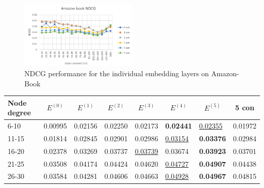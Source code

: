 \begin{figure}[]
    \includegraphics[width=0.5\textwidth]{figures/evaluation/amazon-book-ndcg.png}
    \centering
    \caption{NDCG performance for the individual embedding layers on Amazon-Book}
    \label{fig:ndcg-individual-evaluation-amazon-book}
\end{figure}

\begin{table}[]
    \centering
    \begin{tabular}{|l|l|l|l|l|l|l||l|}
        \hline
        Node degree & \multicolumn{1}{c|}{$E^{(0)}$} & \multicolumn{1}{c|}{$E^{(1)}$} & \multicolumn{1}{c|}{$E^{(2)}$} & \multicolumn{1}{c|}{$E^{(3)}$} & \multicolumn{1}{c|}{$E^{(4)}$} & \multicolumn{1}{c||}{$E^{(5)}$} & \multicolumn{1}{c|}{5 con} \\ \hline
        6-10        & 0.00995                        & 0.02156                        & 0.02250                        & 0.02173                        & \textbf{0.02441}               & \underline{0.02355}             & 0.01972                    \\ \hline
        11-15       & 0.01814                        & 0.02845                        & 0.02901                        & 0.02986                        & \underline{0.03154}            & \textbf{0.03376}                & 0.02984                    \\ \hline
        16-20       & 0.02378                        & 0.03269                        & 0.03737                        & \underline{0.03739}            & 0.03674                        & \textbf{0.03923}                & 0.03701                    \\ \hline
        21-25       & 0.03508                        & 0.04174                        & 0.04424                        & 0.04620                        & \underline{0.04727}            & \textbf{0.04907}                & 0.04438                    \\ \hline
        26-30       & 0.03584                        & 0.04281                        & 0.04606                        & 0.04663                        & \underline{0.04928}            & \textbf{0.04967}                & 0.04815                    \\ \hline

\end{tabular}
\end{table}
